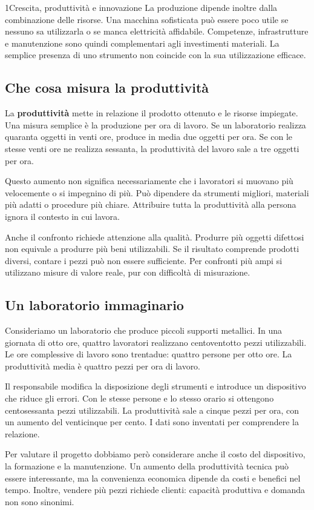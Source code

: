 \begin{lettura}{1}{Crescita, produttività e innovazione}
La produzione dipende inoltre dalla combinazione delle risorse. Una macchina sofisticata può essere poco utile se nessuno sa utilizzarla o se manca elettricità affidabile. Competenze, infrastrutture e manutenzione sono quindi complementari agli investimenti materiali. La semplice presenza di uno strumento non coincide con la sua utilizzazione efficace.

\subsection*{Che cosa misura la produttività}
La \textbf{produttività} mette in relazione il prodotto ottenuto e le risorse impiegate. Una misura semplice è la produzione per ora di lavoro. Se un laboratorio realizza quaranta oggetti in venti ore, produce in media due oggetti per ora. Se con le stesse venti ore ne realizza sessanta, la produttività del lavoro sale a tre oggetti per ora.

Questo aumento non significa necessariamente che i lavoratori si muovano più velocemente o si impegnino di più. Può dipendere da strumenti migliori, materiali più adatti o procedure più chiare. Attribuire tutta la produttività alla persona ignora il contesto in cui lavora.

Anche il confronto richiede attenzione alla qualità. Produrre più oggetti difettosi non equivale a produrre più beni utilizzabili. Se il risultato comprende prodotti diversi, contare i pezzi può non essere sufficiente. Per confronti più ampi si utilizzano misure di valore reale, pur con difficoltà di misurazione.

\subsection*{Un laboratorio immaginario}
Consideriamo un laboratorio che produce piccoli supporti metallici. In una giornata di otto ore, quattro lavoratori realizzano centoventotto pezzi utilizzabili. Le ore complessive di lavoro sono trentadue: quattro persone per otto ore. La produttività media è quattro pezzi per ora di lavoro.

Il responsabile modifica la disposizione degli strumenti e introduce un dispositivo che riduce gli errori. Con le stesse persone e lo stesso orario si ottengono centosessanta pezzi utilizzabili. La produttività sale a cinque pezzi per ora, con un aumento del venticinque per cento. I dati sono inventati per comprendere la relazione.

Per valutare il progetto dobbiamo però considerare anche il costo del dispositivo, la formazione e la manutenzione. Un aumento della produttività tecnica può essere interessante, ma la convenienza economica dipende da costi e benefici nel tempo. Inoltre, vendere più pezzi richiede clienti: capacità produttiva e domanda non sono sinonimi.


\end{lettura}
